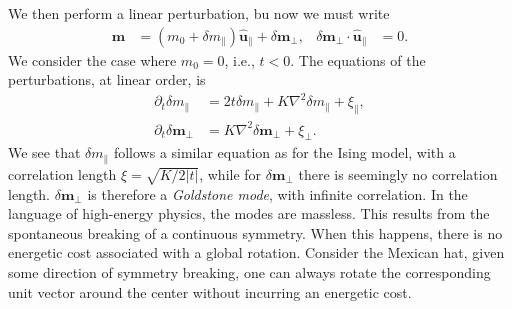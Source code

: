 We then perform a linear perturbation, bu now we must write
%
\begin{align}
    \bm m &= (m_0 + \delta m_\parallel) \hat {\bm u}_\parallel + \delta \bm m_\perp, &
    \delta \bm m_\perp \cdot \hat {\bm u}_\parallel &= 0.
\end{align}
%
We consider the case where $m_0 = 0$, i.e., $t < 0$.
The equations of the perturbations, at linear order, is
%
\begin{align}
    \partial_t \delta m_\parallel 
    & = 
    2 t \delta m_\parallel + K \nabla^2 \delta m_\parallel + \xi_\parallel, \\
    \partial_t \delta \bm m_\perp
    & = K \nabla^2 \delta \bm m_\perp + \xi_\perp.
\end{align}
%
We see that $\delta m_\parallel$ follows a similar equation as for the Ising model, with a correlation length $\xi = \sqrt{ K / 2 |t| }$, while for $\delta \bm m_\perp$ there is seemingly no correlation length.
$\delta \bm m_\perp$ is therefore a \emph{Goldstone mode}, with infinite correlation.
In the language of high-energy physics, the modes are massless.
This results from the spontaneous breaking of a continuous symmetry.
When this happens, there is no energetic cost associated with a global rotation.
Consider the Mexican hat, given some direction of symmetry breaking, one can always rotate the corresponding unit vector around the center without incurring an energetic cost.

